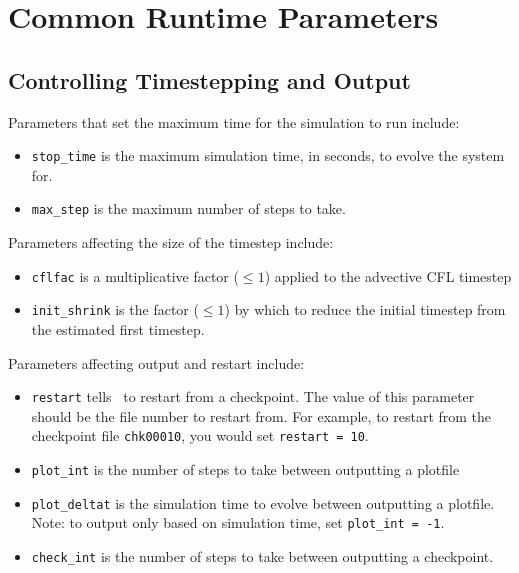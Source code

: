 \section{Common Runtime Parameters}
\label{sec:gettingstarted:runtime}

\subsection{Controlling Timestepping and Output}

Parameters that set the maximum time for the simulation to run
include:
\begin{itemize}
\item {\tt stop\_time} is the maximum simulation time, in seconds,
      to evolve the system for.

\item {\tt max\_step} is the maximum number of steps to take.
\end{itemize}

\noindent Parameters affecting the size of the timestep include:
\begin{itemize}
\item {\tt cflfac} is a multiplicative factor ({\tt $\le 1$}) 
      applied to the advective CFL timestep

\item {\tt init\_shrink} is the factor ({\tt $\le 1$}) by which to reduce 
      the initial timestep from the estimated first timestep.
\end{itemize}

\noindent Parameters affecting output and restart include:
\begin{itemize}

\item {\tt restart} tells \maestro\ to restart from a checkpoint.  The
      value of this parameter should be the file number to restart from.
      For example, to restart from the checkpoint file {\tt chk00010},
      you would set {\tt restart = 10}.

\item {\tt plot\_int} is the number of steps to take between
  outputting a plotfile

\item {\tt plot\_deltat} is the simulation time to evolve between
  outputting a plotfile.  Note: to output only based on simulation
  time, set {\tt plot\_int = -1}.

\item {\tt check\_int} is the number of steps to take between
  outputting a checkpoint.

\end{itemize}

